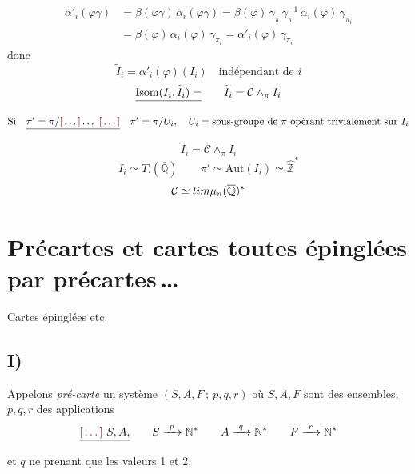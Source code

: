 \documentclass[11pt,a4paper]{article}
\begin{document}
\[
  \begin{aligned}
    \alpha'_{i}(\varphi\gamma) &= \beta(\varphi\gamma)\,\alpha_{i}(\varphi\gamma)
      = \beta(\varphi)\,\gamma_{\pi}\,\gamma_{\pi}^{-1}\,\alpha_{i}(\varphi)\,\gamma_{\pi_{i}}\\
    &= \beta(\varphi)\,\alpha_{i}(\varphi)\,\gamma_{\pi_{i}} = \alpha'_{i}(\varphi)\,\gamma_{\pi_{i}}
  \end{aligned}
\]
donc
\[
  \widetilde{I}_{i} = \alpha'_{i}(\varphi)(I_{i})\quad \text{indépendant de } i
\]
\[
  \struck{\mathrm{Isom}(I_{i}, \widetilde{I}_{i}) =}\qquad
  \widetilde{I}_{i} = \mathcal{C} \wedge_{\pi} I_{i}
\]
\[
  \text{Si}\quad \struck{\pi' = \pi/\ill{} \dots\ \ill{}}\quad
  \pi' = \pi/U_{i},\quad U_{i} = \text{sous-groupe de } \pi \text{ opérant trivialement sur } I_{i}
\]
\[
  \widetilde{I}_{i} = \mathcal{C} \wedge_{\pi} I_{i}
\]
\[
  I_{i} \simeq T_{\cdot}(\overline{\mathbb{Q}})\qquad
  \pi' \simeq \mathrm{Aut}(I_{i}) \simeq \widehat{\mathbb{Z}}^{*}
\]
\[
  \mathcal{C} \simeq \varprojlim \mu_{n}(\overline{\mathbb{Q}})^{*}
\]

\section{Précartes et cartes toutes épinglées par précartes\,…}

Cartes  épinglées etc.

\subsection*{I)}
Appelons \emph{pré-carte} un système $(S, A, F\,;\ p, q, r)$ où $S, A, F$
sont des ensembles, $p, q, r$ des applications
\[
  \struck{\ill{}\ S, A,}\qquad
  S \xrightarrow{\ p\ } \mathbb{N}^{*}\qquad
  A \xrightarrow{\ q\ } \mathbb{N}^{*}\qquad
  F \xrightarrow{\ r\ } \mathbb{N}^{*}
\]
et $q$ ne prenant que les valeurs 1 et 2.
\end{document}
